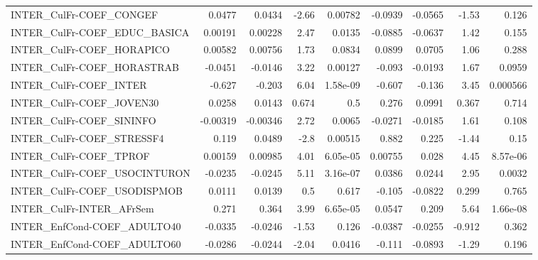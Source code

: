 \begin{tabular}{lrrrrrrrr}
INTER\_CulFr-COEF\_CONGEF               &      0.0477 &       0.0434 &   -2.66 &  0.00782 &    -0.0939 &     -0.0565 &        -1.53 &         0.126 \\
INTER\_CulFr-COEF\_EDUC\_BASICA          &     0.00191 &      0.00228 &    2.47 &   0.0135 &    -0.0885 &     -0.0637 &         1.42 &         0.155 \\
INTER\_CulFr-COEF\_HORAPICO             &     0.00582 &      0.00756 &    1.73 &   0.0834 &     0.0899 &      0.0705 &         1.06 &         0.288 \\
INTER\_CulFr-COEF\_HORASTRAB            &     -0.0451 &      -0.0146 &    3.22 &  0.00127 &     -0.093 &     -0.0193 &         1.67 &        0.0959 \\
INTER\_CulFr-COEF\_INTER                &      -0.627 &       -0.203 &    6.04 & 1.58e-09 &     -0.607 &      -0.136 &         3.45 &      0.000566 \\
INTER\_CulFr-COEF\_JOVEN30              &      0.0258 &       0.0143 &   0.674 &      0.5 &      0.276 &      0.0991 &        0.367 &         0.714 \\
INTER\_CulFr-COEF\_SININFO              &    -0.00319 &     -0.00346 &    2.72 &   0.0065 &    -0.0271 &     -0.0185 &         1.61 &         0.108 \\
INTER\_CulFr-COEF\_STRESSF4             &       0.119 &       0.0489 &    -2.8 &  0.00515 &      0.882 &       0.225 &        -1.44 &          0.15 \\
INTER\_CulFr-COEF\_TPROF                &     0.00159 &      0.00985 &    4.01 & 6.05e-05 &    0.00755 &       0.028 &         4.45 &      8.57e-06 \\
INTER\_CulFr-COEF\_USOCINTURON          &     -0.0235 &      -0.0245 &    5.11 & 3.16e-07 &     0.0386 &      0.0244 &         2.95 &        0.0032 \\
INTER\_CulFr-COEF\_USODISPMOB           &      0.0111 &       0.0139 &     0.5 &    0.617 &     -0.105 &     -0.0822 &        0.299 &         0.765 \\
INTER\_CulFr-INTER\_AFrSem              &       0.271 &        0.364 &    3.99 & 6.65e-05 &     0.0547 &       0.209 &         5.64 &      1.66e-08 \\
INTER\_EnfCond-COEF\_ADULTO40           &     -0.0335 &      -0.0246 &   -1.53 &    0.126 &    -0.0387 &     -0.0255 &       -0.912 &         0.362 \\
INTER\_EnfCond-COEF\_ADULTO60           &     -0.0286 &      -0.0244 &   -2.04 &   0.0416 &     -0.111 &     -0.0893 &        -1.29 &         0.196 \\

\end{tabular}
